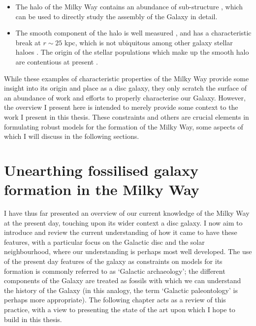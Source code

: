 \begin{itemize}
    \item The halo of the Milky Way contains an abundance of sub-structure \citep{2013NewAR..57..100B}, which can be used to directly study the assembly of the Galaxy in detail.
    \item The smooth component of the halo is well measured \citep[e.g.][]{2011MNRAS.416.2903D}, and has a characteristic break at $r\sim 25$ kpc, which is not ubiquitous among other galaxy stellar haloes \citep[e.g.][]{2013ApJ...763..113D}. The origin of the stellar populations which make up the smooth halo are contentious at present \citep[e.g.][]{2007Natur.450.1020C,2012ApJ...746...34B,2014ApJ...786....7S}.
\end{itemize}

While these examples of characteristic properties of the Milky Way provide some insight into its origin and place as a disc galaxy, they only scratch the surface of an abundance of work and efforts to properly characterise our Galaxy. However, the overview I present here is intended to merely provide some context to the work I present in this thesis. These constraints and others are crucial elements in formulating robust models for the formation of the Milky Way, some aspects of which I will discuss in the following sections.

\section{Unearthing fossilised galaxy formation in the Milky Way}
\label{sec:galacticarchaeology}

I have thus far presented an overview of our current knowledge of the Milky Way at the present day, touching upon its wider context a disc galaxy. I now aim to introduce and review the current understanding of how it came to have these features, with a particular focus on the Galactic disc and the solar neighbourhood, where our understanding is perhaps most well developed. The use of the present day features of the galaxy as constraints on models for its formation is commonly referred to as `Galactic archaeology'; the different components of the Galaxy are treated as fossils with which we can understand the history of the Galaxy (in this analogy, the term `Galactic paleontology' is perhaps more appropriate). The following chapter acts as a review of this practice, with a view to presenting the state of the art upon which I hope to build in this thesis.

